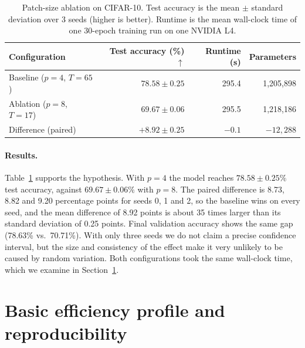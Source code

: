 \documentclass{article}
\begin{document}
\begin{table}[h]
  \caption{Patch-size ablation on CIFAR-10. Test accuracy is the mean $\pm$
  standard deviation over 3 seeds (higher is better). Runtime is the mean
  wall-clock time of one 30-epoch training run on one NVIDIA L4.}
  \label{tab:results}
  \centering
  \begin{tabular}{lrrr}
    \toprule
    Configuration & Test accuracy (\%) $\uparrow$ & Runtime (s) & Parameters \\
    \midrule
    Baseline ($p{=}4$, $T{=}65$) & $78.58 \pm 0.25$ & 295.4 & 1{,}205{,}898 \\
    Ablation ($p{=}8$, $T{=}17$) & $69.67 \pm 0.06$ & 295.5 & 1{,}218{,}186 \\
    \midrule
    Difference (paired)          & $+8.92 \pm 0.25$ & $-0.1$ & $-12{,}288$ \\
    \bottomrule
  \end{tabular}
\end{table}

\paragraph{Results.}
Table~\ref{tab:results} supports the hypothesis. With $p{=}4$ the model
reaches $78.58 \pm 0.25\%$ test accuracy, against $69.67 \pm 0.06\%$ with
$p{=}8$. The paired difference is 8.73, 8.82 and 9.20 percentage points for
seeds 0, 1 and 2, so the baseline wins on every seed, and the mean
difference of 8.92 points is about 35 times larger than its standard
deviation of 0.25 points. Final validation accuracy shows the same gap
(78.63\% vs.\ 70.71\%). With only three seeds we do not claim a precise
confidence interval, but the size and consistency of the effect make it
very unlikely to be caused by random variation. Both configurations took
the same wall-clock time, which we examine in Section~\ref{sec:efficiency}.

\section{Basic efficiency profile and reproducibility}


\label{sec:efficiency}
\end{document}
